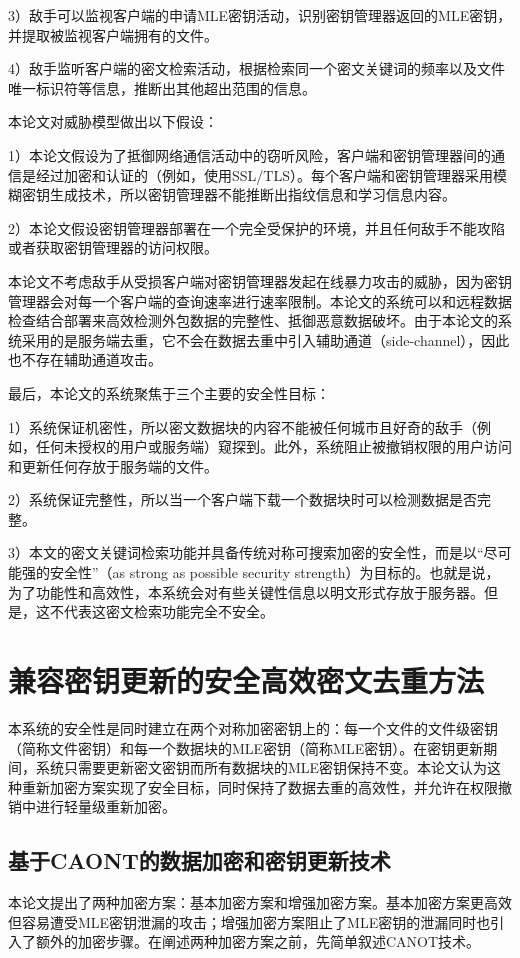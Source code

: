 \documentclass[promaster]{thesis-uestc}
\begin{document}
3）敌手可以监视客户端的申请MLE密钥活动，识别密钥管理器返回的MLE密钥，并提取被监视客户端拥有的文件。

4）敌手监听客户端的密文检索活动，根据检索同一个密文关键词的频率以及文件唯一标识符等信息，推断出其他超出范围的信息。

本论文对威胁模型做出以下假设：

1）本论文假设为了抵御网络通信活动中的窃听风险，客户端和密钥管理器间的通信是经过加密和认证的（例如，使用SSL/TLS）。每个客户端和密钥管理器采用模糊密钥生成技术，所以密钥管理器不能推断出指纹信息和学习信息内容。

2）本论文假设密钥管理器部署在一个完全受保护的环境，并且任何敌手不能攻陷或者获取密钥管理器的访问权限。

本论文不考虑敌手从受损客户端对密钥管理器发起在线暴力攻击的威胁，因为密钥管理器会对每一个客户端的查询速率进行速率限制。本论文的系统可以和远程数据检查结合部署来高效检测外包数据的完整性、抵御恶意数据破坏。由于本论文的系统采用的是服务端去重，它不会在数据去重中引入辅助通道（side-channel），因此也不存在辅助通道攻击。

最后，本论文的系统聚焦于三个主要的安全性目标：

1）系统保证机密性，所以密文数据块的内容不能被任何城市且好奇的敌手（例如，任何未授权的用户或服务端）窥探到。此外，系统阻止被撤销权限的用户访问和更新任何存放于服务端的文件。

2）系统保证完整性，所以当一个客户端下载一个数据块时可以检测数据是否完整。

3）本文的密文关键词检索功能并具备传统对称可搜索加密的安全性，而是以“尽可能强的安全性”（as strong as possible  security strength）为目标的。也就是说，为了功能性和高效性，本系统会对有些关键性信息以明文形式存放于服务器。但是，这不代表这密文检索功能完全不安全。


\section{兼容密钥更新的安全高效密文去重方法}\label{CAONT}
本系统的安全性是同时建立在两个对称加密密钥上的：每一个文件的文件级密钥（简称文件密钥）和每一个数据块的MLE密钥（简称MLE密钥）。在密钥更新期间，系统只需要更新密文密钥而所有数据块的MLE密钥保持不变。本论文认为这种重新加密方案实现了安全目标，同时保持了数据去重的高效性，并允许在权限撤销中进行轻量级重新加密。

\subsection{基于CAONT的数据加密和密钥更新技术}\label{基于CANOT的数据加密和密钥更新技术}
本论文提出了两种加密方案：基本加密方案和增强加密方案。基本加密方案更高效但容易遭受MLE密钥泄漏的攻击；增强加密方案阻止了MLE密钥的泄漏同时也引入了额外的加密步骤。在阐述两种加密方案之前，先简单叙述CANOT技术。
\end{document}
